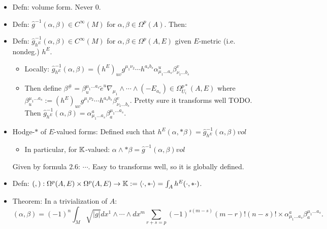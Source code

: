 {\begin{itemize}
\begin{itemize}
        \item Defn: volume form. Never $0$.
        
        \item Defn: $\hat g^{-1}(\alpha, \beta) \in C^\infty(M)$ for $\alpha, \beta \in  \Omega^p(A)$. Then:
        
        \item Defn: $\hat g^{-1}_{h^E}(\alpha, \beta) \in C^\infty(M)$ for $\alpha, \beta \in \Omega^p(A, E)$ given $E$-metric (i.e. nondeg.) $h^E$.
        
            \begin{itemize}
                
            \item Locally: $\hat g^{-1}_{h^E}(\alpha, \beta) = (h^E)_{uv} g^{\mu_1 \nu_2} \cdots h^{a_s b_s} \alpha^u_{\mu_1 \dots a_s} \beta^v_{\nu_1 \dots b_s} $ 
            
            \item Then define $\beta^\# = \beta_u^{\mu_1 \dots a_s} \tilde e^u \nabla_{\mu_1}\wedge \cdots \wedge (-E_{a_s}) \in \Omega^{p*}_{U_i}(A, E)$ where $\beta_u^{\mu_1 \dots a_s} := (h^E)_{uv} g^{\mu_1 \nu_2} \cdots h^{a_s b_s} \beta^v_{\nu_1 \dots b_s}$. Pretty sure it transforms well TODO. Then $\hat g^{-1}_{h^E}(\alpha, \beta) = \alpha^a_{\mu_1 \dots a_s} \beta_a^{\mu_1 \dots a_s}$.
                
            \end{itemize}
        
        \item Hodge-$*$ of $E$-valued forms: Defined such that $h^E(\alpha, *\beta) = \hat g^{-1}_{h^E}(\alpha, \beta) vol$
        
            \begin{itemize}
                
            \item In particular, for $\mathbb{K}$-valued: $\alpha \wedge *\beta =\hat g^{-1}(\alpha, \beta) vol$
                
            \end{itemize}
        Given by formula $2.6$: $\cdots$. Easy to transforms well, so it is globally defined.
        
        \item Defn: $(,): \Omega^p(A, E) \times \Omega^p(A, E) \to \mathbb{K} := \langle \cdot , * \cdot \rangle = \int_A h^E(\cdot, * \cdot)$.
        
        \item Theorem: In a trivialization of $A$:
        \begin{equation}
            (\alpha, \beta) = (-1)^n \int_M \sqrt{|g|} dx^1 \wedge \cdots \wedge dx^m \sum_{r + s = p} (-1)^{s(m-s)} (m-r)! (n-s)! \times \alpha^a_{\mu_1 \dots a_s} \beta_a^{\mu_1 \dots a_s}.
        \end{equation}
            
        \end{itemize}
        
    \end{itemize}

}

